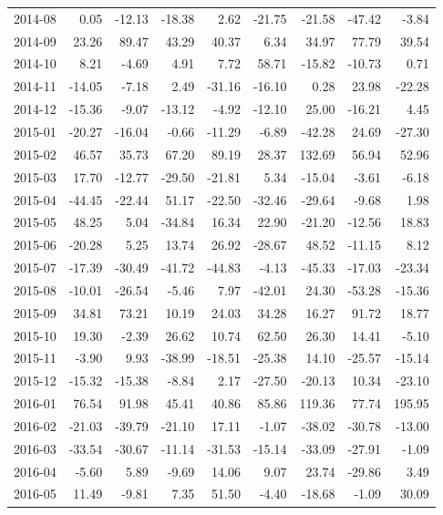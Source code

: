 \begin{table}[ht]
\begin{tabular}{lrrrrrrrr}
  2014-08 & 0.05 & -12.13 & -18.38 & 2.62 & -21.75 & -21.58 & -47.42 & -3.84 \\ 
  2014-09 & 23.26 & 89.47 & 43.29 & 40.37 & 6.34 & 34.97 & 77.79 & 39.54 \\ 
  2014-10 & 8.21 & -4.69 & 4.91 & 7.72 & 58.71 & -15.82 & -10.73 & 0.71 \\ 
  2014-11 & -14.05 & -7.18 & 2.49 & -31.16 & -16.10 & 0.28 & 23.98 & -22.28 \\ 
  2014-12 & -15.36 & -9.07 & -13.12 & -4.92 & -12.10 & 25.00 & -16.21 & 4.45 \\ 
  2015-01 & -20.27 & -16.04 & -0.66 & -11.29 & -6.89 & -42.28 & 24.69 & -27.30 \\ 
  2015-02 & 46.57 & 35.73 & 67.20 & 89.19 & 28.37 & 132.69 & 56.94 & 52.96 \\ 
  2015-03 & 17.70 & -12.77 & -29.50 & -21.81 & 5.34 & -15.04 & -3.61 & -6.18 \\ 
  2015-04 & -44.45 & -22.44 & 51.17 & -22.50 & -32.46 & -29.64 & -9.68 & 1.98 \\ 
  2015-05 & 48.25 & 5.04 & -34.84 & 16.34 & 22.90 & -21.20 & -12.56 & 18.83 \\ 
  2015-06 & -20.28 & 5.25 & 13.74 & 26.92 & -28.67 & 48.52 & -11.15 & 8.12 \\ 
  2015-07 & -17.39 & -30.49 & -41.72 & -44.83 & -4.13 & -45.33 & -17.03 & -23.34 \\ 
  2015-08 & -10.01 & -26.54 & -5.46 & 7.97 & -42.01 & 24.30 & -53.28 & -15.36 \\ 
  2015-09 & 34.81 & 73.21 & 10.19 & 24.03 & 34.28 & 16.27 & 91.72 & 18.77 \\ 
  2015-10 & 19.30 & -2.39 & 26.62 & 10.74 & 62.50 & 26.30 & 14.41 & -5.10 \\ 
  2015-11 & -3.90 & 9.93 & -38.99 & -18.51 & -25.38 & 14.10 & -25.57 & -15.14 \\ 
  2015-12 & -15.32 & -15.38 & -8.84 & 2.17 & -27.50 & -20.13 & 10.34 & -23.10 \\ 
  2016-01 & 76.54 & 91.98 & 45.41 & 40.86 & 85.86 & 119.36 & 77.74 & 195.95 \\ 
  2016-02 & -21.03 & -39.79 & -21.10 & 17.11 & -1.07 & -38.02 & -30.78 & -13.00 \\ 
  2016-03 & -33.54 & -30.67 & -11.14 & -31.53 & -15.14 & -33.09 & -27.91 & -1.09 \\ 
  2016-04 & -5.60 & 5.89 & -9.69 & 14.06 & 9.07 & 23.74 & -29.86 & 3.49 \\ 
  2016-05 & 11.49 & -9.81 & 7.35 & 51.50 & -4.40 & -18.68 & -1.09 & 30.09 \\ 

\end{tabular}
\end{table}
